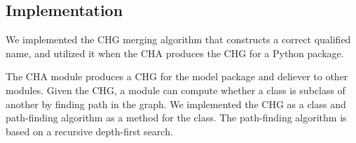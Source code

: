 \subsection{Implementation}
We implemented the CHG merging algorithm that constructs a correct
qualified name, and utilized it when the CHA produces the CHG for
a Python package. 

The CHA module produces a CHG for the model package and deliever to
other modules. Given the CHG, a module can compute whether a class is
subclass of another by finding path in the graph.
We implemented the CHG as a class and path-finding algorithm as
a method for the class. The path-finding algorithm is based on
a recursive depth-first search.


